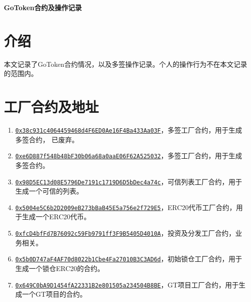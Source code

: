 \documentclass[12pt]{article}
\newcommand{\ethaddr}[1]{{\href{https://etherscan.io/address/#1}{\texttt{#1}}}}
\begin{document}
\pagestyle{empty}
\renewcommand{\contentsname}{目录}
\renewcommand{\abstractname}{摘要}
\renewcommand{\refname}{参考文献}
\renewcommand{\figurename}{图}
\renewcommand{\tablename}{表}
\renewcommand{\baselinestretch}{1.5}
\renewcommand{\appendixname}{附录}
\renewcommand{\proofname}{证明}

\pagecolor{\pcolor}

\begin{titlepage}
  \begin{center}
    \vspace*{5.5cm}

    \vspace{0.5cm}


   \textbf{\huge{GoToken合约及操作记录}}

    \vspace{0.5cm}
    
    \textbf{}
  \end{center}

\end{titlepage}
\setcounter{page}{0}
\tableofcontents
\newpage
\setcounter{page}{1}
\pagestyle{fancy}
\vspace*{0.01cm}

\section{介绍}
本文记录了GoToken合约情况，以及多签操作记录。个人的操作行为不在本文记录的范围内。

\section{工厂合约及地址}
\begin{enumerate}

\item \ethaddr{0x38c931c4064459468d4F6ED0Ae16F4Ba433Aa03F}，多签工厂合约，用于生成多签合约，{\color{red} 已废弃}。
\item \ethaddr{0xe6D887f548b48bF30b06a68a0aaE06F62A525032}，多签工厂合约，用于生成多签合约。
\item \ethaddr{0x98D5EC13d08E5796De7191c1719D6D5bDec4a74c}，可信列表工厂合约，用于生成一个可信的列表。
\item \ethaddr{0x5004e5C6b2D2009eB273bBaB45E5a756e2f729E5}，ERC20代币工厂合约，用于生成一个ERC20代币。
\item \ethaddr{0xfcD4bfFd7B76092c59Fb9791ff3F9B5405D4010A}，投资及分发工厂合约，业务相关。
\item \ethaddr{0x5b0D747aF4AF70d8022b1Cbe4Fa27010B3C3AD6d}，初始锁仓工厂合约，用于生成一个锁仓ERC20的合约。
\item \ethaddr{0x649C0bA9D1454fA22331B2e801505a234504B8BE}，GT项目工厂合约，用于生成一个GT项目的合约。
\end{enumerate}
\end{document}

